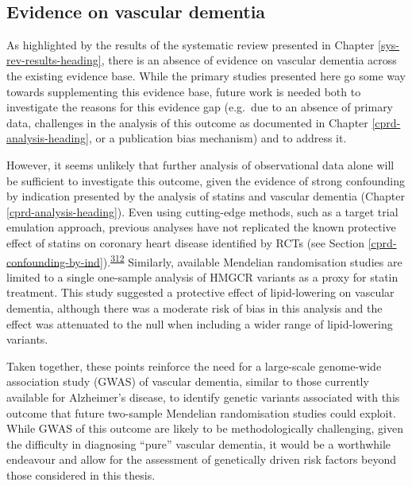 \documentclass[a4paper, twoside]{templates/ociamthesis}
\begin{document}
~

\hypertarget{evidence-on-vascular-dementia}{%
\subsection{Evidence on vascular dementia}\label{evidence-on-vascular-dementia}}

As highlighted by the results of the systematic review presented in Chapter \ref{sys-rev-results-heading}, there is an absence of evidence on vascular dementia across the existing evidence base. While the primary studies presented here go some way towards supplementing this evidence base, future work is needed both to investigate the reasons for this evidence gap (e.g.~due to an absence of primary data, challenges in the analysis of this outcome as documented in Chapter \ref{cprd-analysis-heading}, or a publication bias mechanism) and to address it.

However, it seems unlikely that further analysis of observational data alone will be sufficient to investigate this outcome, given the evidence of strong confounding by indication presented by the analysis of statins and vascular dementia (Chapter \ref{cprd-analysis-heading}). Even using cutting-edge methods, such as a target trial emulation approach, previous analyses have not replicated the known protective effect of statins on coronary heart disease identified by RCTs (see Section \ref{cprd-confounding-by-ind}).\textsuperscript{\protect\hyperlink{ref-danaei2013}{312}} Similarly, available Mendelian randomisation studies are limited to a single one-sample analysis of HMGCR variants as a proxy for statin treatment. This study suggested a protective effect of lipid-lowering on vascular dementia, although there was a moderate risk of bias in this analysis and the effect was attenuated to the null when including a wider range of lipid-lowering variants.

Taken together, these points reinforce the need for a large-scale genome-wide association study (GWAS) of vascular dementia, similar to those currently available for Alzheimer's disease, to identify genetic variants associated with this outcome that future two-sample Mendelian randomisation studies could exploit. While GWAS of this outcome are likely to be methodologically challenging, given the difficulty in diagnosing ``pure'' vascular dementia, it would be a worthwhile endeavour and allow for the assessment of genetically driven risk factors beyond those considered in this thesis.
\end{document}
